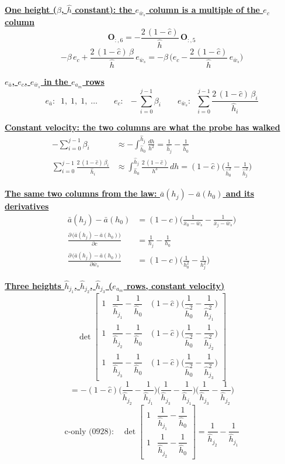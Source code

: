 \documentclass[11pt,a4paper]{ctexart}
\newcommand{\bx}{\bar{x}}
\newcommand{\ba}{\bar{a}}
\newcommand{\bw}{\bar{w}}
\newcommand{\hh}{\hat{h}}
\newcommand{\ch}{\hat{c}}
\newcommand{\hd}[1]{\par\bigskip\noindent\underline{\textbf{#1}}}
\begin{document}
\hd{One height ($\beta$, $\hh$ constant): the $e_{\bw_s}$ column is a multiple of the $e_c$ column}
\[
\mathbf{O}_{:,6} = -\frac{2\,(1-\ch)}{\hh}\,\mathbf{O}_{:,5}
\]
\[
-\beta\,e_c + \frac{2\,(1-\ch)\,\beta}{\hh}\,e_{\bw_s} = -\beta\,\Big(e_c - \frac{2\,(1-\ch)}{\hh}\,e_{\bw_s}\Big)
\]

\hd{$e_{\ba}$, $e_c$, $e_{\bw_s}$ in the $e_{a_m}$ rows}
\[
e_{\ba}:\;\; 1,\; 1,\; 1,\; \dots \qquad
e_c:\;\; -\sum_{i=0}^{j-1}\beta_i \qquad
e_{\bw_s}:\;\; \sum_{i=0}^{j-1}\frac{2\,(1-\ch)\,\beta_i}{\hh_i}
\]

\hd{Constant velocity: the two columns are what the probe has walked}
\[
\begin{aligned}
-\sum_{i=0}^{j-1}\beta_i &\approx -\int_{\hh_0}^{\hh_j}\frac{dh}{h^{2}} = \frac{1}{\hh_j} - \frac{1}{\hh_0} \\
\sum_{i=0}^{j-1}\frac{2\,(1-\ch)\,\beta_i}{\hh_i} &\approx \int_{\hh_0}^{\hh_j}\frac{2\,(1-\ch)}{h^{3}}\,dh = (1-\ch)\Big(\frac{1}{\hh_0^{2}} - \frac{1}{\hh_j^{2}}\Big)
\end{aligned}
\]

\hd{The same two columns from the law: $\ba(h_j) - \ba(h_0)$ and its derivatives}
\[
\begin{aligned}
\ba(h_j) - \ba(h_0) &= (1-c)\Big(\frac{1}{\bx_0 - \bw_s} - \frac{1}{\bx_j - \bw_s}\Big) \\
\frac{\partial\,\big(\ba(h_j) - \ba(h_0)\big)}{\partial c} &= \frac{1}{h_j} - \frac{1}{h_0} \\
\frac{\partial\,\big(\ba(h_j) - \ba(h_0)\big)}{\partial \bw_s} &= (1-c)\Big(\frac{1}{h_0^{2}} - \frac{1}{h_j^{2}}\Big)
\end{aligned}
\]

\hd{Three heights $\hh_{j_1}$, $\hh_{j_2}$, $\hh_{j_3}$ ($e_{a_m}$ rows, constant velocity)}
\[
\det\begin{bmatrix}
1 & \dfrac{1}{\hh_{j_1}} - \dfrac{1}{\hh_0} & (1-\ch)\Big(\dfrac{1}{\hh_0^{2}} - \dfrac{1}{\hh_{j_1}^{2}}\Big) \\[1.6ex]
1 & \dfrac{1}{\hh_{j_2}} - \dfrac{1}{\hh_0} & (1-\ch)\Big(\dfrac{1}{\hh_0^{2}} - \dfrac{1}{\hh_{j_2}^{2}}\Big) \\[1.6ex]
1 & \dfrac{1}{\hh_{j_3}} - \dfrac{1}{\hh_0} & (1-\ch)\Big(\dfrac{1}{\hh_0^{2}} - \dfrac{1}{\hh_{j_3}^{2}}\Big)
\end{bmatrix}
\]
\[
= -(1-\ch)\Big(\frac{1}{\hh_{j_2}} - \frac{1}{\hh_{j_1}}\Big)\Big(\frac{1}{\hh_{j_3}} - \frac{1}{\hh_{j_1}}\Big)\Big(\frac{1}{\hh_{j_3}} - \frac{1}{\hh_{j_2}}\Big)
\]
\[
\text{c-only (0928):}\quad
\det\begin{bmatrix}
1 & \dfrac{1}{\hh_{j_1}} - \dfrac{1}{\hh_0} \\[1.6ex]
1 & \dfrac{1}{\hh_{j_2}} - \dfrac{1}{\hh_0}
\end{bmatrix}
= \frac{1}{\hh_{j_2}} - \frac{1}{\hh_{j_1}}
\]
\end{document}

